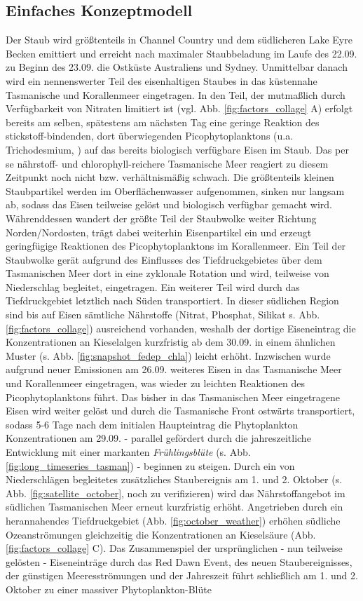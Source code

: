 \documentclass[12pt,a4paper,onecolumn]{scrartcl}
\begin{document}
\subsection{Einfaches Konzeptmodell}
Der Staub wird größtenteils in Channel Country und dem südlicheren Lake Eyre Becken emittiert und erreicht nach maximaler Staubbeladung im Laufe des 22.09. zu Beginn des 23.09. die Ostküste Australiens und Sydney. Unmittelbar danach wird ein nennenswerter Teil des eisenhaltigen Staubes in das küstennahe Tasmanische und Korallenmeer eingetragen. In den Teil, der mutmaßlich durch Verfügbarkeit von  Nitraten limitiert ist (vgl. Abb. \ref{fig:factors_collage} A) erfolgt bereits am selben, spätestens am nächsten Tag eine geringe Reaktion des stickstoff-bindenden, dort überwiegenden Picophytoplanktons (u.a. Trichodesmium, \cite{Rubin.2011}) auf das bereits biologisch verfügbare Eisen im Staub. Das per se nährstoff- und chlorophyll-reichere Tasmanische Meer reagiert zu diesem Zeitpunkt noch nicht bzw. verhältnismäßig schwach. Die größtenteils kleinen Staubpartikel werden im Oberflächenwasser aufgenommen, sinken nur langsam ab, sodass das Eisen teilweise gelöst und biologisch verfügbar gemacht wird. Währenddessen wandert der größte Teil der Staubwolke weiter Richtung Norden/Nordosten, trägt dabei weiterhin Eisenpartikel ein und erzeugt geringfügige Reaktionen des Picophytoplanktons im  Korallenmeer. Ein Teil der Staubwolke gerät aufgrund des Einflusses des Tiefdruckgebietes über dem Tasmanischen Meer dort in eine zyklonale Rotation und wird, teilweise von Niederschlag begleitet, eingetragen. Ein weiterer Teil wird durch das Tiefdruckgebiet letztlich nach Süden transportiert. In dieser südlichen Region sind bis auf Eisen sämtliche Nährstoffe (Nitrat, Phosphat, Silikat s. Abb. \ref{fig:factors_collage}) ausreichend vorhanden, weshalb der dortige Eiseneintrag die Konzentrationen an Kieselalgen kurzfristig ab dem 30.09. in einem ähnlichen Muster (s. Abb. \ref{fig:snapshot_fedep_chla}) leicht erhöht. Inzwischen wurde aufgrund neuer Emissionen am 26.09. weiteres Eisen in das Tasmanische Meer und Korallenmeer eingetragen, was wieder zu leichten Reaktionen des Picophytoplanktons führt. Das bisher in das Tasmanischen Meer eingetragene Eisen wird weiter gelöst und durch die Tasmanische Front ostwärts transportiert, sodass 5-6 Tage nach dem initialen Haupteintrag die Phytoplankton Konzentrationen am 29.09. - parallel gefördert durch die jahreszeitliche Entwicklung mit einer markanten \textit{Frühlingsblüte} (s. Abb. \ref{fig:long_timeseries_tasman}) - beginnen zu steigen. Durch ein von Niederschlägen begleitetes zusätzliches Staubereignis am 1. und 2. Oktober (s. Abb. \ref{fig:satellite_october}, noch zu verifizieren) wird das Nährstoffangebot im südlichen Tasmanischen Meer erneut kurzfristig erhöht. Angetrieben durch ein herannahendes Tiefdruckgebiet (Abb. \ref{fig:october_weather}) erhöhen südliche Ozeanströmungen gleichzeitig die Konzentrationen an Kieselsäure (Abb. \ref{fig:factors_collage} C). Das Zusammenspiel der ursprünglichen - nun teilweise gelösten - Eiseneinträge durch das Red Dawn Event, des neuen Staubereignisses, der günstigen Meeresströmungen und der Jahreszeit führt schließlich am 1. und 2. Oktober zu einer massiver Phytoplankton-Blüte 
\end{document}
